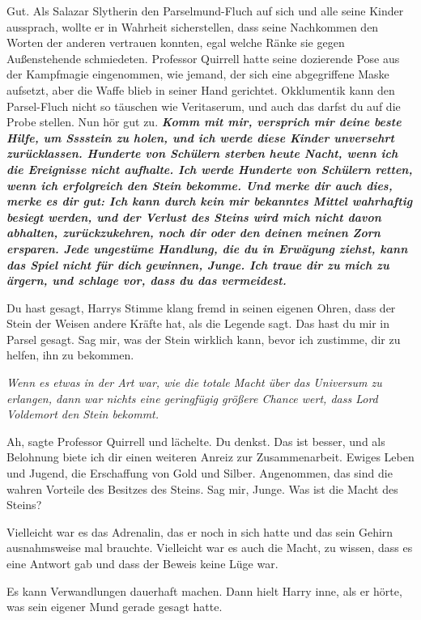 \glqq{}Gut. Als Salazar Slytherin den Parselmund-Fluch auf sich und alle seine
Kinder aussprach, wollte er in Wahrheit sicherstellen, dass seine Nachkommen den
Worten der anderen vertrauen konnten, egal welche Ränke sie gegen Außenstehende
schmiedeten.\grqq{} Professor Quirrell hatte seine dozierende Pose aus der Kampfmagie
eingenommen, wie jemand, der sich eine abgegriffene Maske aufsetzt, aber die
Waffe blieb in seiner Hand gerichtet. \glqq{}Okklumentik kann den Parsel-Fluch
nicht so täuschen wie Veritaserum, und auch das darfst du auf die Probe stellen.
Nun hör gut zu.
\textbf{}
\textbf{\emph{Komm mit mir, versprich mir deine beste Hilfe, um Sssstein zu
holen, und ich werde diese Kinder unversehrt zurücklassen. Hunderte von Schülern
sterben heute Nacht, wenn ich die Ereignisse nicht aufhalte. Ich werde Hunderte
von Schülern retten, wenn ich erfolgreich den Stein bekomme. Und merke dir auch
dies, merke es dir gut: Ich kann durch kein mir bekanntes Mittel wahrhaftig
besiegt werden, und der Verlust des Steins wird mich nicht davon abhalten,
zurückzukehren, noch dir oder den deinen meinen Zorn ersparen. Jede ungestüme
Handlung, die du in Erwägung ziehst, kann das Spiel nicht für dich gewinnen,
Junge. Ich traue dir zu mich zu ärgern, und schlage vor, dass du das
vermeidest.}}\grqq{}

\glqq{}Du hast gesagt\grqq{}, Harrys Stimme klang fremd in seinen eigenen Ohren,
\glqq{}dass der Stein der Weisen andere Kräfte hat, als die Legende sagt. Das
hast du mir in Parsel gesagt. Sag mir, was der Stein wirklich kann, bevor ich
zustimme, dir zu helfen, ihn zu bekommen.\grqq{}

\emph{Wenn es etwas in der Art war, wie die totale Macht über das Universum zu
erlangen, dann war nichts eine geringfügig größere Chance wert, dass Lord
Voldemort den Stein bekommt.}

\glqq{}Ah\grqq{}, sagte Professor Quirrell und lächelte. \glqq{}Du denkst. Das ist
besser, und als Belohnung biete ich dir einen weiteren Anreiz zur
Zusammenarbeit. Ewiges Leben und Jugend, die Erschaffung von Gold und Silber.
Angenommen, das sind die wahren Vorteile des Besitzes des Steins. Sag mir,
Junge. Was ist die Macht des Steins?\grqq{}

Vielleicht war es das Adrenalin, das er noch in sich hatte und das sein Gehirn
ausnahmsweise mal brauchte. Vielleicht war es auch die Macht, zu wissen, dass es
eine Antwort gab und dass der Beweis keine Lüge war.

\glqq{}Es kann Verwandlungen dauerhaft machen.\grqq{} Dann hielt Harry inne, als er
hörte, was sein eigener Mund gerade gesagt hatte.

